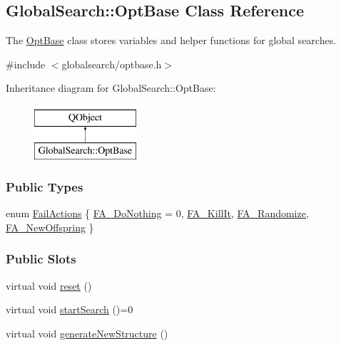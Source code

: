 \hypertarget{classGlobalSearch_1_1OptBase}{}\subsection{Global\+Search\+:\+:Opt\+Base Class Reference}
\label{classGlobalSearch_1_1OptBase}


The \hyperlink{classGlobalSearch_1_1OptBase}{Opt\+Base} class stores variables and helper functions for global searches.  




{\ttfamily \#include $<$globalsearch/optbase.\+h$>$}

Inheritance diagram for Global\+Search\+:\+:Opt\+Base\+:\begin{figure}[H]
\begin{center}
\leavevmode
\includegraphics[height=2.000000cm]{classGlobalSearch_1_1OptBase}
\end{center}
\end{figure}
\subsubsection*{Public Types}
\begin{DoxyCompactItemize}
\item 
enum \hyperlink{classGlobalSearch_1_1OptBase_a970b328cd0a36335c34c6b24c6ac2775}{Fail\+Actions} \{ \hyperlink{classGlobalSearch_1_1OptBase_a970b328cd0a36335c34c6b24c6ac2775ab04d2d04ae7df7ba1da75a185c53dfca}{F\+A\+\_\+\+Do\+Nothing} = 0, 
\hyperlink{classGlobalSearch_1_1OptBase_a970b328cd0a36335c34c6b24c6ac2775a4457ab4b5903c890b0edf0817bf00e74}{F\+A\+\_\+\+Kill\+It}, 
\hyperlink{classGlobalSearch_1_1OptBase_a970b328cd0a36335c34c6b24c6ac2775a79cd7097c06d1b27824ae7c90201276a}{F\+A\+\_\+\+Randomize}, 
\hyperlink{classGlobalSearch_1_1OptBase_a970b328cd0a36335c34c6b24c6ac2775a548d59265329ca034e4e99257b85aa5e}{F\+A\+\_\+\+New\+Offspring}
 \}
\end{DoxyCompactItemize}
\subsubsection*{Public Slots}
\begin{DoxyCompactItemize}
\item 
virtual void \hyperlink{classGlobalSearch_1_1OptBase_aeb13548fad4b090a7e570011292fd389}{reset} ()
\item 
virtual void \hyperlink{classGlobalSearch_1_1OptBase_adc0d183586cb9433edc941ccea4cd1a4}{start\+Search} ()=0
\item 
virtual void \hyperlink{classGlobalSearch_1_1OptBase_a24b6e929232e6b82551c3917bf7dcc1c}{generate\+New\+Structure} ()
\end{DoxyCompactItemize}
